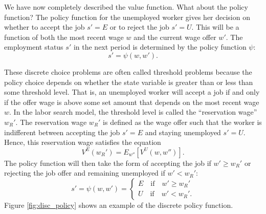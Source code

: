 We have now completely described the value function. What about the policy function?
The policy function for the unemployed worker gives her decision on whether to accept the job $s'=E$
or to reject the job $s'= U$.
This will be a function of both the most recent wage $w$ and the current wage offer $w'$.
The employment status $s'$ in the next period is determined by the policy function $\psi$:
\[
s' = \psi(w,w').
\]

These discrete choice problems are often called threshold
problems because the policy choice depends on whether the state variable is greater than or less than
some threshold level. That is, an unemployed worker will accept a job if and only if the offer wage is
above some set amount that depends on the most recent wage $w$. In the labor search model,
the threshold level is called the ``reservation wage'' $w_R'$. The reservation wage $w_R'$ is defined as
the wage offer such that the worker is indifferent between accepting the job $s' = E$ and
staying unemployed $s' = U$. Hence, this reservation wage satisfies the equation
\begin{equation}\label{EqWR}
   V^E(w_R') = E_{w''}\left[V^U(w,w'')\right].
\end{equation}
The policy function will then take the form of accepting the job if $w' \geq w_R'$ or
rejecting the job offer and remaining unemployed if $w' < w_R'$:
\begin{equation}\label{EqSprime}
   s' = \psi(w,w') = \begin{cases}
                      E \quad\text{if}\quad w' \geq w_R' \\
                      U \quad\text{if}\quad w' < w_R'.
                   \end{cases}
\end{equation}
Figure \ref{fig:disc_policy} shows an example of the discrete policy function.

